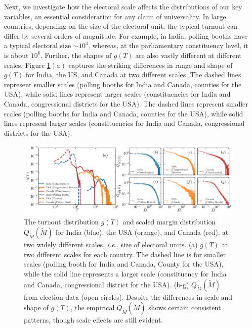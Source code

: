 Next, we investigate how the electoral scale affects the distributions of our key variables, an essential consideration for any claim of universality. In large countries, depending on the size of the electoral unit, the typical turnout can differ by several orders of magnitude. For example, in India, polling booths have a typical electoral size $\sim 10^3$, whereas, at the parliamentary constituency level, it is about $10^6$. Further, the shapes of $g(T)$ are also vastly different at different scales. Figure \ref{fig:scale_independence}$(a)$ captures the striking differences in range and shape of $g(T)$ for India, the US, and Canada at two different scales. The dashed lines represent smaller scales (polling booths for India and Canada, counties for the USA), while solid lines represent larger scales (constituencies for India and Canada, congressional districts for the USA). The dashed lines represent smaller scales (polling booths for India and Canada, counties for the USA), while solid lines represent larger scales (constituencies for India and Canada, congressional districts for the USA).

\begin{figure}[H]
    \centering
    \includegraphics[width=\textwidth]{chapters/chapter4/turnout_margin_empirical_distribution_diff_scale.pdf}
    \caption{The turnout distribution $g(T)$ and scaled margin distribution $Q_{\widetilde{M}}\left(\widetilde{M}\right)$ for India (blue), the USA (orange), and Canada (red), at two widely different scales, {\it i.e.}, size of electoral units. (a) $g(T)$ at two different scales for each country. The dashed line is for smaller scales (polling booth for India and Canada, County for the USA), while the solid line represents a larger scale (constituency for India and Canada, congressional district for the USA). (b-g) $Q_{\widetilde{M}}\left(\widetilde{M}\right)$ from election data (open circles). Despite the differences in scale and shape of $g(T)$, the empirical $Q_{\widetilde{M}}\left(\widetilde{M}\right)$ shows certain consistent patterns, though scale effects are still evident.}
    \label{fig:scale_independence}
\end{figure}

